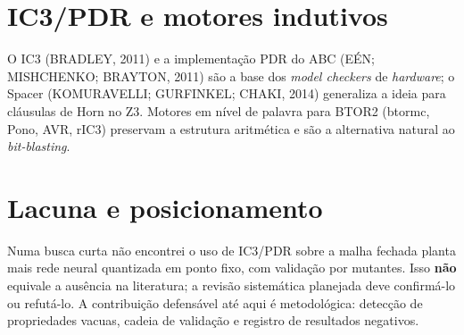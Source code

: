 \section{IC3/PDR e motores indutivos}

O IC3 (BRADLEY, 2011) e a implementação PDR do ABC (EÉN; MISHCHENKO; BRAYTON, 2011) são a base dos \emph{model checkers} de \emph{hardware}; o Spacer (KOMURAVELLI; GURFINKEL; CHAKI, 2014) generaliza a ideia para cláusulas de Horn no Z3. Motores em nível de palavra para BTOR2 (btormc, Pono, AVR, rIC3) preservam a estrutura aritmética e são a alternativa natural ao \emph{bit-blasting}.

\section{Lacuna e posicionamento}

Numa busca curta não encontrei o uso de IC3/PDR sobre a malha fechada planta mais rede neural quantizada em ponto fixo, com validação por mutantes. Isso \textbf{não} equivale a ausência na literatura; a revisão sistemática planejada deve confirmá-lo ou refutá-lo. A contribuição defensável até aqui é metodológica: detecção de propriedades vacuas, cadeia de validação e registro de resultados negativos.
